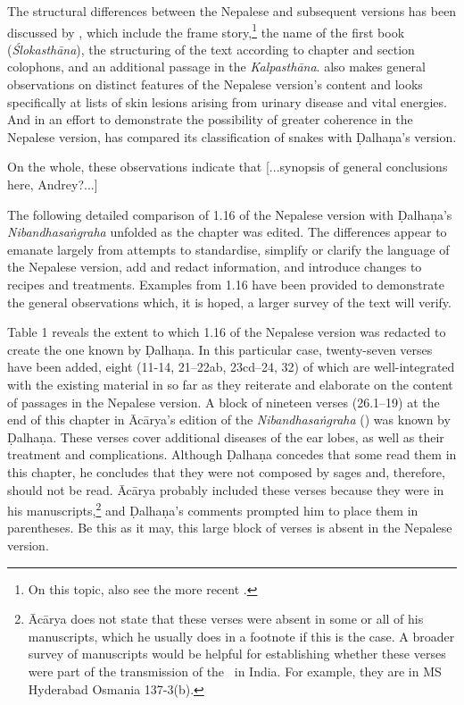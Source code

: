 The structural differences between the Nepalese and subsequent versions has been discussed by \citet[27–44]{kleb-2021b}, which include the frame story,\footnote{On this topic, also see the more recent \citet{birc-2021}.} the name of the first book (\emph{Ślokasthāna}), the structuring of the text according to chapter and section colophons, and an additional passage in the \emph{Kalpasthāna}. \citet[44–55]{kleb-2021b} also makes general observations on distinct features of the Nepalese version's content and looks specifically at lists of skin lesions arising from urinary disease and vital energies. And in an effort to demonstrate the possibility of greater coherence in the Nepalese version, \citet[101–104]{hari-2011} has compared its classification of snakes with Ḍalhaṇa's version. 

On the whole, these observations indicate that [...synopsis of general conclusions here, Andrey?...]

The following detailed comparison of 1.16 of the Nepalese version with Ḍalhaṇa's \emph{Nibandhasaṅgraha} unfolded as the chapter was edited. The differences appear to emanate largely from attempts to standardise, simplify or clarify the language of the Nepalese version, add and redact information, and introduce changes to recipes and treatments. Examples from 1.16 have been provided to demonstrate the general observations which, it is hoped, a larger survey of the text will verify.

Table 1 reveals the extent to which 1.16 of the Nepalese version was redacted to create the one known by Ḍalhaṇa. In this particular case, twenty-seven verses have been added, eight (11-14, 21–22ab, 23cd–24, 32) of which are well-integrated with the existing material in so far as they reiterate and elaborate on the content of passages in the Nepalese version. A block of nineteen verses (26.1–19) at the end of this chapter in Ācārya's edition of the \emph{Nibandhasaṅgraha} (\cite[80]{vulgate}) was known by Ḍalhaṇa. These verses cover additional diseases of the ear lobes, as well as their treatment and complications. Although Ḍalhaṇa concedes that some read them in this chapter, he concludes that they were not composed by sages and, therefore, should not be read. Ācārya probably included these verses because they were in his manuscripts,\footnote{Ācārya does not state that these verses were absent in some or all of his manuscripts, which he usually does in a footnote if this is the case. A broader survey of manuscripts would be helpful for establishing whether these verses were part of the transmission of the \SS\ in India. For example, they are in MS Hyderabad Osmania 137-3(b).} and Ḍalhaṇa's comments prompted him to place them in parentheses. Be this as it may, this large block of verses is absent in the Nepalese version. 

